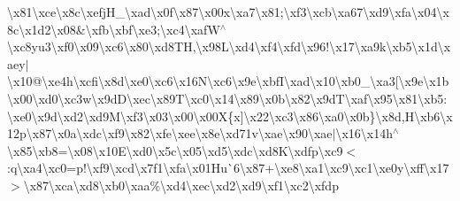 \begin{DoxyCompactItemize}
\textbackslash{}x81\textbackslash{}xce\textbackslash{}x8c\textbackslash{}xefj\+H\+\_\textbackslash{}xad\textbackslash{}x0f\textbackslash{}x87\textbackslash{}x00x\textbackslash{}xa7\textbackslash{}x81;\textbackslash{}xf3\textbackslash{}xcb\textbackslash{}xa67\textbackslash{}xd9\textbackslash{}xfa\textbackslash{}x04\textbackslash{}x8c\textbackslash{}x1d2\textbackslash{}x08\&\textbackslash{}xfb\textbackslash{}xbf\textbackslash{}xe3;\textbackslash{}xc4\textbackslash{}xaf\+W$^\wedge$\textbackslash{}xc8yu3\textbackslash{}xf0\textbackslash{}x09\textbackslash{}xc6\textbackslash{}x80\textbackslash{}xd8\+T\+H,\textbackslash{}x98\+L\textbackslash{}xd4\textbackslash{}xf4\textbackslash{}xfd\textbackslash{}x96!\textbackslash{}x17\textbackslash{}xa9k\textbackslash{}xb5\textbackslash{}x1d\textbackslash{}xaey$\vert$\textbackslash{}x10@\textbackslash{}xe4h\textbackslash{}xcfi\textbackslash{}x8d\textbackslash{}xe0\textbackslash{}xc6\textbackslash{}x16\+N\textbackslash{}xc6\textbackslash{}x9e\textbackslash{}xbf\+I\textbackslash{}xad\textbackslash{}x10\textbackslash{}xb0\+\_\+\textbackslash{}xa3\mbox{[}\textbackslash{}x9e\textbackslash{}x1b\textbackslash{}x00\textbackslash{}xd0\textbackslash{}xc3w\textbackslash{}x9d\+D\textbackslash{}xec\textbackslash{}x89\+T\textbackslash{}xc0\textbackslash{}x14\textbackslash{}x89\textbackslash{}x0b\textbackslash{}x82\textbackslash{}x9d\+T\textbackslash{}xaf\textbackslash{}x95\textbackslash{}x81\textbackslash{}xb5\+:\textbackslash{}xe0\textbackslash{}x9d\textbackslash{}xd2\textbackslash{}xd9\+M\textbackslash{}xf3\textbackslash{}x03\textbackslash{}x00\textbackslash{}x00\+X\{x\mbox{]}\textbackslash{}x22\textbackslash{}xc3\textbackslash{}x86\textbackslash{}xa0\textbackslash{}x0b\}\textbackslash{}x8d,\+H\textbackslash{}xb6\textbackslash{}x12p\textbackslash{}x87\textbackslash{}x0a\textbackslash{}xdc\textbackslash{}xf9\textbackslash{}x82\textbackslash{}xfe\textbackslash{}xee\textbackslash{}x8e\textbackslash{}xd71v\textbackslash{}xae\textbackslash{}x90\textbackslash{}xae$\vert$\textbackslash{}x16\textbackslash{}x14h$^\wedge$\textbackslash{}x85\textbackslash{}xb8=\textbackslash{}x08\textbackslash{}x10\+E\textbackslash{}xd0\textbackslash{}x5c\textbackslash{}x05\textbackslash{}xd5\textbackslash{}xdc\textbackslash{}xd8\+K\textbackslash{}xdfp\textbackslash{}xc9$<$\+:q\textbackslash{}xa4\textbackslash{}xc0=p!\textbackslash{}xf9\textbackslash{}xcd\textbackslash{}x7f\textquotesingle{}1\textbackslash{}xfa\textbackslash{}x01\+Hu\`{}6\textbackslash{}x87+\textbackslash{}xe8\textbackslash{}xa1\textbackslash{}xc9\textbackslash{}xc1\textbackslash{}xe0y\textbackslash{}xff\textbackslash{}x17$>$\textbackslash{}x87\textbackslash{}xca\textbackslash{}xd8\textbackslash{}xb0\textbackslash{}xaa\%\textbackslash{}xd4\textbackslash{}xec\textbackslash{}xd2\textbackslash{}xd9\textbackslash{}xf1\textbackslash{}xc2\textbackslash{}xfdp 
\end{DoxyCompactItemize}
